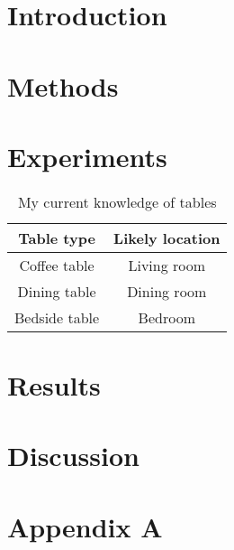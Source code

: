 \documentclass[twoside]{article}
\begin{document}
\begin{multicols}{2} %

\section{Introduction}

\lipsum[2-4]



\section{Methods}

\lipsum[5-9]


\section{Experiments}

\lipsum[10-16]

\begin{table}[H]
\caption{My current knowledge of tables}
\centering
\begin{tabular}{cc}
\textbf{Table type} & \textbf{Likely location}\\
\midrule
Coffee table & Living room\\
Dining table & Dining room\\
Bedside table & Bedroom
\end{tabular}
\end{table}


\section{Results}

\lipsum[12-14]



\section{Discussion}

\lipsum[15-16]




{}


\section*{Appendix A}

\lipsum[17]


\end{multicols}
\end{document}
